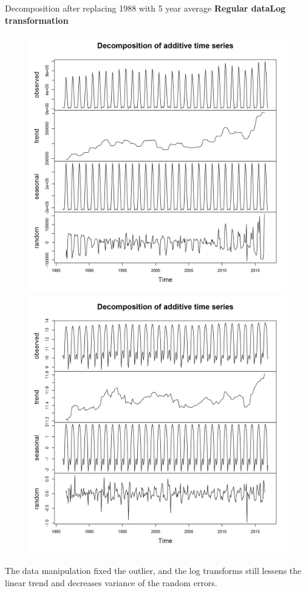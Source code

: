 \documentclass[xcolor=dvipsnames]{beamer}
\begin{document}
\begin{frame}{Decomposition after replacing 1988 with 5 year average}
\small{\textbf{Regular data}\hfill \textbf{Log transformation}}
\vspace{-1em}
\begin{figure}
\centering\includegraphics[width=.42\linewidth]{../outlier/visits-components-ts-plot-outlier.png} \hfill \centering\includegraphics[width=.42\linewidth]{../outlier/Logvisits-ts-plot-outlier.png}
\end{figure}

\vfill 
\footnotesize The data manipulation fixed the outlier, and the log transforms still lessens the linear trend and decreases variance of the random errors. 
\end{frame}
\end{document}
